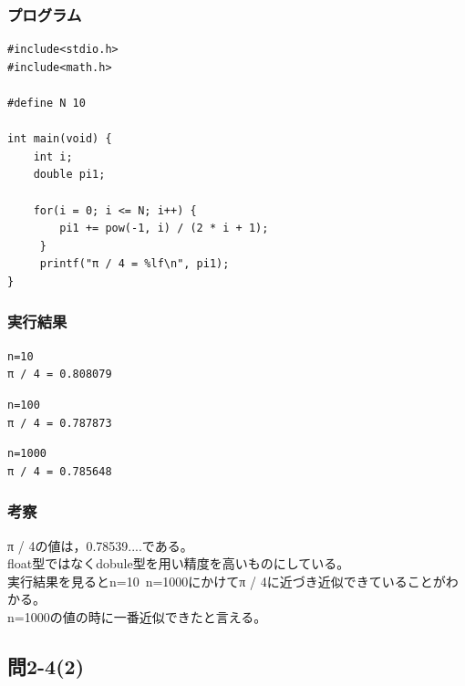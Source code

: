 \documentclass{jarticle}
\begin{document}
\subsubsection{プログラム\\}
\begin{breakbox}
\begin{verbatim}
#include<stdio.h>
#include<math.h>

#define N 10 

int main(void) { 
    int i;
    double pi1;

    for(i = 0; i <= N; i++) {
        pi1 += pow(-1, i) / (2 * i + 1);
     }
     printf("π / 4 = %lf\n", pi1);
}
\end{verbatim}
\end{breakbox}
\subsubsection{実行結果\\}
\begin{breakbox}
\begin{verbatim}
n=10
π / 4 = 0.808079
\end{verbatim}
\end{breakbox}
\begin{breakbox}
\begin{verbatim}
n=100
π / 4 = 0.787873
\end{verbatim}
\end{breakbox}

\begin{breakbox}
\begin{verbatim}
n=1000
π / 4 = 0.785648
\end{verbatim}
\end{breakbox}
\subsubsection{考察\\}
π / 4の値は，0.78539....である。\\
float型ではなくdobule型を用い精度を高いものにしている。\\
実行結果を見るとn=10~n=1000にかけてπ / 4に近づき近似できていることがわかる。\\
n=1000の値の時に一番近似できたと言える。\\

\subsection{問2-4(2)\\}
\end{document}
